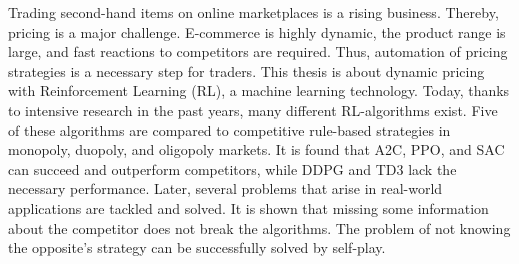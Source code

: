 Trading second-hand items on online marketplaces is a rising business.
Thereby, pricing is a major challenge.
E-commerce is highly dynamic, the product range is large, and fast reactions to competitors are required.
Thus, automation of pricing strategies is a necessary step for traders.
This thesis is about dynamic pricing with Reinforcement Learning (RL), a machine learning technology.
Today, thanks to intensive research in the past years, many different RL-algorithms exist.
Five of these algorithms are compared to competitive rule-based strategies in monopoly, duopoly, and oligopoly markets.
It is found that A2C, PPO, and SAC can succeed and outperform competitors, while DDPG and TD3 lack the necessary performance.
Later, several problems that arise in real-world applications are tackled and solved.
It is shown that missing some information about the competitor does not break the algorithms.
The problem of not knowing the opposite's strategy can be successfully solved by self-play.

